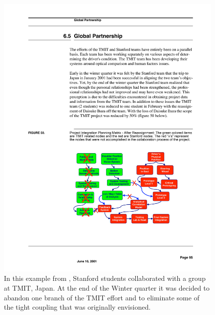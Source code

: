\begin{figure}[bhtp] 
\centering
		\includegraphics[width=\textwidth]{Figures/Ch6/su-tmit-after.pdf}
	\caption[Project task replanning example]{In this example from \cite{Toyota01}, Stanford students collaborated with a group at TMIT, Japan. At the end of the Winter quarter it was decided to abandon one branch of the TMIT effort and to eliminate some of the tight coupling that was originally envisioned. }
	\label{fig:su-tmit}  %
\end{figure}

